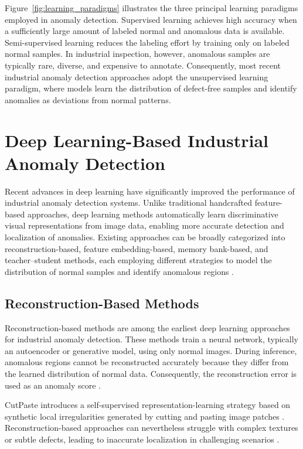 \documentclass[12pt,openany,oneside]{book}
\begin{document}
Figure~\ref{fig:learning_paradigms} illustrates the three principal learning paradigms employed in anomaly detection. Supervised learning achieves high accuracy when a sufficiently large amount of labeled normal and anomalous data is available. Semi-supervised learning reduces the labeling effort by training only on labeled normal samples. In industrial inspection, however, anomalous samples are typically rare, diverse, and expensive to annotate. Consequently, most recent industrial anomaly detection approaches adopt the unsupervised learning paradigm, where models learn the distribution of defect-free samples and identify anomalies as deviations from normal patterns.





\section{Deep Learning-Based Industrial Anomaly Detection}

Recent advances in deep learning have significantly improved the performance of industrial anomaly detection systems. Unlike traditional handcrafted feature-based approaches, deep learning methods automatically learn discriminative visual representations from image data, enabling more accurate detection and localization of anomalies. Existing approaches can be broadly categorized into reconstruction-based, feature embedding-based, memory bank-based, and teacher--student methods, each employing different strategies to model the distribution of normal samples and identify anomalous regions \cite{liu2024survey}.
\subsection{Reconstruction-Based Methods}

Reconstruction-based methods are among the earliest deep learning approaches for industrial anomaly detection. These methods train a neural network, typically an autoencoder or generative model, using only normal images. During inference, anomalous regions cannot be reconstructed accurately because they differ from the learned distribution of normal data. Consequently, the reconstruction error is used as an anomaly score \cite{liu2024survey}.

CutPaste introduces a self-supervised representation-learning strategy based on synthetic local irregularities generated by cutting and pasting image patches \cite{li2021cutpaste}. Reconstruction-based approaches can nevertheless struggle with complex textures or subtle defects, leading to inaccurate localization in challenging scenarios \cite{liu2024survey}.
\end{document}
